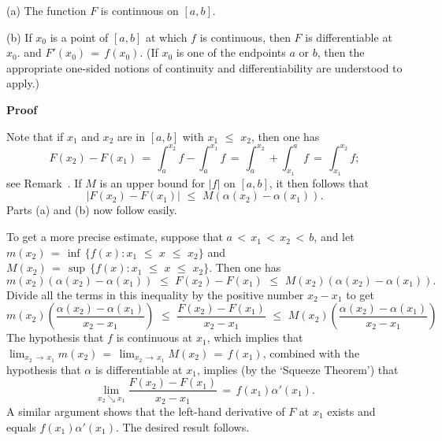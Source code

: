         (a) The function $F$ is continuous on $[a,b]$.

\V

        (b) If $x_{0}$ is a point of $[a,b]$ at which $f$ is continuous, then $F$ is differentiable at $x_{0}$. and $F'(x_{0}) \,=\, f(x_{0})$.
    (If $x_{0}$ is one of the endpoints $a$ or $b$, then the appropriate one-sided notions of continuity and differentiability are understood to apply.)


\V

        {\bf Proof}%

\V

        Note that if $x_{1}$ and $x_{2}$ are in $[a,b]$ with $x_{1}\,\,{\leq}\,\,x_{2}$, then one has
        \begin{displaymath}
        F(x_{2}) - F(x_{1}) \,=\, \int_{a}^{x_{2}} f - \int_{a}^{x_{1}} f \,=\, \int_{a}^{x_{2}} + \int_{x_{1}}^{a} f
    \,=\, \int_{x_{1}}^{x_{2}} f;
        \end{displaymath}
    see Remark~.
    If $M$ is an upper bound for $|f|$ on $[a,b]$, it then follows that
        \begin{displaymath}
        |F(x_{2}) - F(x_{1})|\,\,{\leq}\,\,M\left({\alpha}(x_{2})-{\alpha}(x_{1})\right).
        \end{displaymath}
    Parts (a) and (b) now follow easily.

     To get a more precise estimate, suppose that $a\,<\,x_{1}\,<\,x_{2}\,<\,b$, and let
    $m(x_{2}) \,=\, {\inf}\,\{f(x): x_{1}\,\,{\leq}\,\,x\,\,{\leq}\,\,x_{2}\}$ 
    and
    $M(x_{2}) \,=\, {\sup}\,\{f(x): x_{1}\,\,{\leq}\,\,x\,\,{\leq}\,\,x_{2}\}$.
    Then one has
        \begin{displaymath}
        m(x_{2})({\alpha}(x_{2}) - {\alpha}(x_{1}))\,\,{\leq}\,\,F(x_{2}) - F(x_{1})\,\,{\leq}\,\,M(x_{2})({\alpha}(x_{2})-{\alpha}(x_{1})).
        \end{displaymath}
    Divide all the terms in this inequality by the positive number $x_{2}-x_{1}$ to get
        \begin{displaymath}
        m(x_{2})\left(\frac{{\alpha}(x_{2}) - {\alpha}(x_{1})}{x_{2}-x_{1}}\right)
    \,\,{\leq}\,\,
        \frac{F(x_{2}) - F(x_{1})}{x_{2} - x_{1}} \,\,{\leq}\,\,
        M(x_{2})\left(\frac{{\alpha}(x_{2}) - {\alpha}(x_{1})}{x_{2} - x_{1}}\right)
        \end{displaymath}
    The hypothesis that $f$ is continuous at $x_{1}$, which implies that $\lim_{x_{2} \,{\rightarrow}\, x_{1}} m(x_{2}) \,=\,
    \lim_{x_{2} \,{\rightarrow}\, x_{1}} M(x_{2}) \,=\, f(x_{1})$, combined with the hypothesis that ${\alpha}$ is differentiable at $x_{1}$,
    implies (by the `Squeeze Theorem') that
        \begin{displaymath}
        \lim_{x_{2}{\searrow}x_{1}} \frac{F(x_{2}) - F(x_{1})}{x_{2}-x_{1}} \,=\, f(x_{1}){\alpha}'(x_{1}).
        \end{displaymath}
    A similar argument shows that the left-hand derivative of $F$ at $x_{1}$ exists and equals $f(x_{1}){\alpha}'(x_{1})$.
    The desired result follows.

